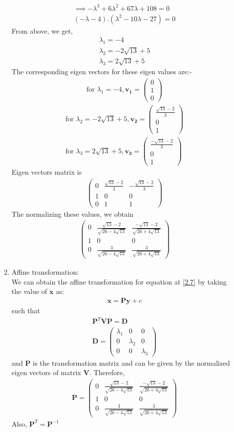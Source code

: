 \documentclass[journal,12pt,twocolumn]{IEEEtran}
\let\vec\mathbf
\numberwithin{equation}{subsection}
\newcommand{\myvec}[1]{\ensuremath{\begin{pmatrix}#1\end{pmatrix}}}
\begin{document}
\begin{enumerate}
\begin{enumerate}
\begin{align}
\implies -\lambda^3 + 6\lambda^2 + 67\lambda + 108 =0 \\
(-\lambda-4).(\lambda^2 -10\lambda -27) = 0
\end{align}
From above, we get,
\begin{align}
\lambda_1 = -4\\
\lambda_2=-2\sqrt{13} + 5\\
\lambda_3=2\sqrt{13} + 5
\end{align}
The corresponding eigen vectors for these eigen values are:-
\begin{align}
\text{for } \lambda_1 = -4 ,\vec{ v_1} = \myvec{0\\1\\0}
\end{align}
\begin{align}
\text{for } \lambda_2=-2\sqrt{13} + 5 , \vec{ v_2}= \myvec{\frac{\sqrt{13} -2}{3}\\0\\1}\\
\text{for } \lambda_3=2\sqrt{13} + 5 , \vec{ v_3} = \myvec{\frac{-\sqrt{13} -2}{3}\\0\\1}
\end{align}
Eigen vectors matrix is
\begin{align}
\myvec{0 &\frac{\sqrt{13} -2}{3}&-\frac{\sqrt{13} -2}{3}\\1 &0&0\\0&1&1}
\end{align}
The normalizing these values, we obtain
\begin{align}
\myvec{0 &\frac{\sqrt{13} -2}{\sqrt{26-4\sqrt{13}}}&\frac{-\sqrt{13} -2}{\sqrt{26+4\sqrt{13}}}\\1 &0&0\\0&\frac{3}{\sqrt{26-4\sqrt{13}}}&\frac{3}{\sqrt{26+4\sqrt{13}}}}
\end{align}
\item Affine transformation:\\
We can obtain the affine transformation for equation at \eqref{2.7} by taking the value of $\vec{x}$ as:
\begin{align}
\vec{x} = \vec{P}\vec{y} + c 
\end{align}
such that
\begin{align}
\vec{P}^T\vec{V}\vec{P}= \vec{D} \\ 
\vec{D}=\myvec{\lambda_1&0&0\\0&\lambda_2&0\\0&0&\lambda_3}
\end{align}
and $\vec{P}$ is the transformation matrix and can be given by the normalized eigen vectors of matrix $\vec{V}$. Therefore,
\begin{align}
\vec{P} = \myvec{0 &\frac{\sqrt{13} -2}{\sqrt{26-4\sqrt{13}}}&\frac{-\sqrt{13} -2}{\sqrt{26+4\sqrt{13}}}\\1 &0&0\\0&\frac{3}{\sqrt{26-4\sqrt{13}}}&\frac{3}{\sqrt{26+4\sqrt{13}}}}
\end{align}
Also, $\vec{P}^T = \vec{P}^{-1}$


\end{enumerate}
\end{enumerate}
\end{document}
